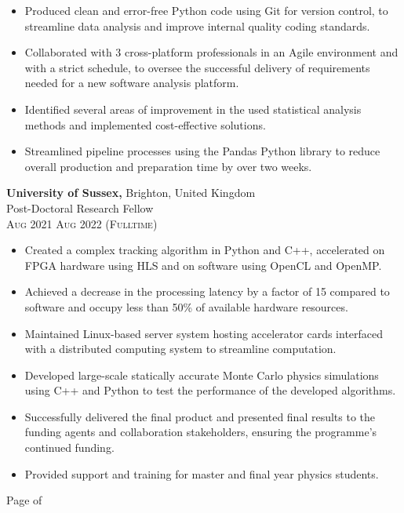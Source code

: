 \documentclass[oneside]{article}
\newcommand{\empitem}[7]{
        {\large \textbf{#1,}} 
        {{\fontseries{light}\selectfont #2}}\\
        {{\fontseries{medium}\selectfont #3}} \\
        {\scshape\fontseries{light}\selectfont\footnotesize #4 \textendash{} #5 (#6)} 
        #7
}
\begin{document}
{\begin{minipage}[t][\dimexpr\textheight-2\fboxrule-2\fboxsep\relax][t]{\dimexpr0.6\textwidth-2\fboxrule-2\fboxsep\relax}
{\begin{itemize}
            \item Produced clean and error-free Python code using Git for version control, to streamline data analysis and improve internal quality coding standards.
            \item Collaborated with 3 cross-platform professionals in an Agile environment and with a strict schedule, to oversee the successful delivery of requirements needed for a new software analysis platform.
            \item Identified several areas of improvement in the used statistical analysis methods and implemented cost-effective solutions.
            \item Streamlined pipeline processes using the Pandas Python library to reduce overall production and preparation time by over two weeks.
        \end{itemize}
        }
%
        \empitem{University of Sussex}
        {Brighton, United Kingdom}
        {Post-Doctoral Research Fellow}
        {Aug 2021}
        {Aug 2022}
        {Fulltime}
        {
        \begin{itemize}
            \setlength{\itemsep}{-3pt}
            \item Created a complex tracking algorithm in Python and C++, accelerated on FPGA hardware using HLS and on software using OpenCL and OpenMP.
            \item Achieved a decrease in the processing latency by a factor of 15 compared to software and occupy less than 50\% of available hardware resources.
            \item Maintained Linux-based server system hosting accelerator cards interfaced with a distributed computing system to streamline computation.
            \item Developed large-scale statically accurate Monte Carlo physics simulations using C++ and Python to test the performance of the developed algorithms.
            \item Successfully delivered the final product and presented final results to the funding agents and collaboration stakeholders, ensuring the programme's continued funding.
            \item Provided support and training for master and final year physics students.
        \end{itemize}
        }
        \vfill%
        {\hfill\small{}\selectfont Page \thepage of \pageref{LastPage}\hfill}
    \end{minipage}
}
\end{document}
